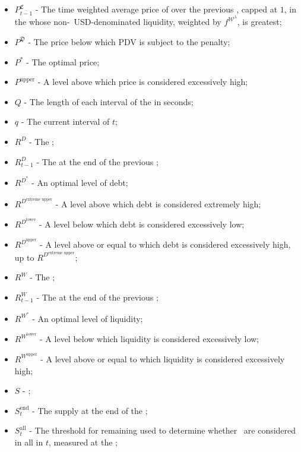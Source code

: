 \documentclass[class=article, crop=false]{standalone}
\begin{document}
\begin{itemize}[topsep=0pt, itemsep=2pt,leftmargin=16pt]
    \item[] $P_{\overline{t-1}}^{\mathfrak{C}}$ - The time weighted average price of  over the previous , capped at $1$, in the  whose non-\Pinto\ USD-denominated liquidity, weighted by $f^{\mathscr{W}^{\lambda}}$, is greatest;
    \item[] $P^{\mathfrak{D}}$ - The price below which  PDV is subject to the  penalty;
    \item[] $P^{*}$ - The optimal price;
    \item[] $P^{\text{upper}}$ - A level above which price is considered excessively high;
    \item[] $Q$ - The length of each interval of the  in seconds; 
    \item[] $q$ - The current interval of $t$;
    \item[] $R^{D}$ - The ;
    \item[] $R_{t-1}^{D}$ - The  at the end of the previous ;
    \item[] $R^{D^{*}}$ - An optimal level of debt;
    \item[] $R^{D^{\text{extreme upper}}}$ - A level above which debt is considered extremely high;
    \item[] $R^{D^{\text{lower}}}$ - A level below which debt is considered excessively low;
    \item[] $R^{D^{\text{upper}}}$ - A level above or equal to which debt is considered excessively high, up to $R^{D^{\text{extreme upper}}}$;
    \item[] $R^{W}$ - The ;
    \item[] $R_{t-1}^{W}$ - The  at the end of the previous ;
    \item[] $R^{W^{*}}$ - An optimal level of liquidity;
    \item[] $R^{W^{\text{lower}}}$ - A level below which liquidity is considered excessively low;
    \item[] $R^{W^{\text{upper}}}$ - A level above or equal to which liquidity is considered excessively high;
    \item[] $S$ - ;
    \item[] $S_{t}^{\text{end}}$ - The  supply at the end of the ;
    \item[] $S_t^{\text{all}}$ - The threshold for remaining  used to determine whether \Pinto\ are considered  in all  in  $t$, measured at the ;

\end{itemize}
\end{document}

